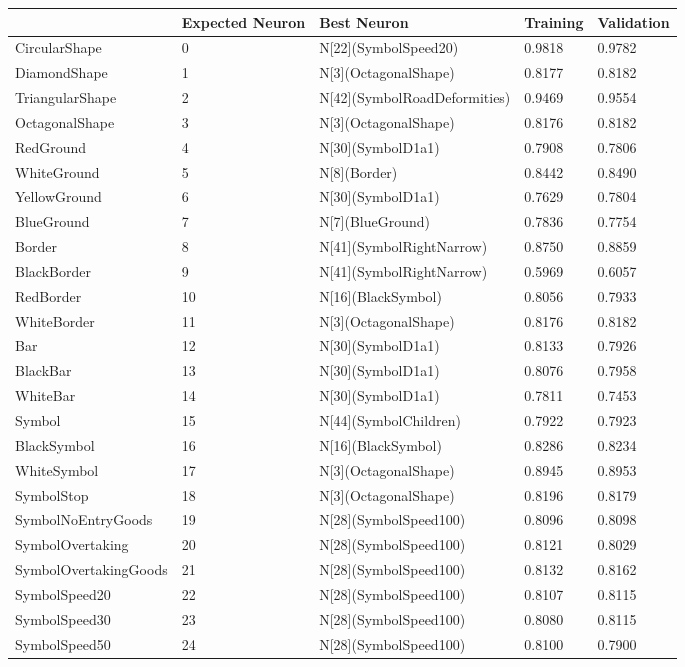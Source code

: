 \begin{tabular}{lllll}
\toprule
 & Expected Neuron & Best Neuron & Training & Validation \\
\midrule
CircularShape & 0 & N[22](SymbolSpeed20) & 0.9818 & 0.9782 \\
DiamondShape & 1 & N[3](OctagonalShape) & 0.8177 & 0.8182 \\
TriangularShape & 2 & N[42](SymbolRoadDeformities) & 0.9469 & 0.9554 \\
OctagonalShape & 3 & N[3](OctagonalShape) & 0.8176 & 0.8182 \\
RedGround & 4 & N[30](SymbolD1a1) & 0.7908 & 0.7806 \\
WhiteGround & 5 & N[8](Border) & 0.8442 & 0.8490 \\
YellowGround & 6 & N[30](SymbolD1a1) & 0.7629 & 0.7804 \\
BlueGround & 7 & N[7](BlueGround) & 0.7836 & 0.7754 \\
Border & 8 & N[41](SymbolRightNarrow) & 0.8750 & 0.8859 \\
BlackBorder & 9 & N[41](SymbolRightNarrow) & 0.5969 & 0.6057 \\
RedBorder & 10 & N[16](BlackSymbol) & 0.8056 & 0.7933 \\
WhiteBorder & 11 & N[3](OctagonalShape) & 0.8176 & 0.8182 \\
Bar & 12 & N[30](SymbolD1a1) & 0.8133 & 0.7926 \\
BlackBar & 13 & N[30](SymbolD1a1) & 0.8076 & 0.7958 \\
WhiteBar & 14 & N[30](SymbolD1a1) & 0.7811 & 0.7453 \\
Symbol & 15 & N[44](SymbolChildren) & 0.7922 & 0.7923 \\
BlackSymbol & 16 & N[16](BlackSymbol) & 0.8286 & 0.8234 \\
WhiteSymbol & 17 & N[3](OctagonalShape) & 0.8945 & 0.8953 \\
SymbolStop & 18 & N[3](OctagonalShape) & 0.8196 & 0.8179 \\
SymbolNoEntryGoods & 19 & N[28](SymbolSpeed100) & 0.8096 & 0.8098 \\
SymbolOvertaking & 20 & N[28](SymbolSpeed100) & 0.8121 & 0.8029 \\
SymbolOvertakingGoods & 21 & N[28](SymbolSpeed100) & 0.8132 & 0.8162 \\
SymbolSpeed20 & 22 & N[28](SymbolSpeed100) & 0.8107 & 0.8115 \\
SymbolSpeed30 & 23 & N[28](SymbolSpeed100) & 0.8080 & 0.8115 \\
SymbolSpeed50 & 24 & N[28](SymbolSpeed100) & 0.8100 & 0.7900 \\

\end{tabular}

